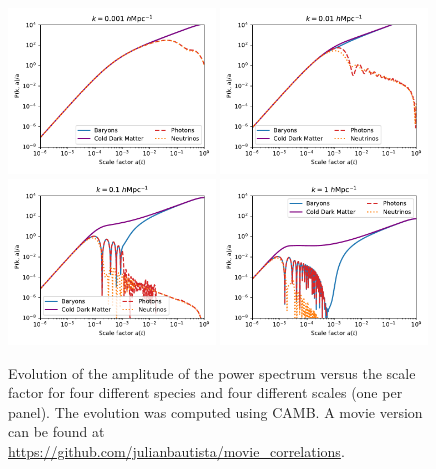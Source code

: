     \begin{figure}[t]
        \centering
        \includegraphics[width=0.49\textwidth]{fig/intro/pk_versus_time_k0.001.pdf}
        \includegraphics[width=0.49\textwidth]{fig/intro/pk_versus_time_k0.01.pdf}
        \includegraphics[width=0.49\textwidth]{fig/intro/pk_versus_time_k0.1.pdf}
        \includegraphics[width=0.49\textwidth]{fig/intro/pk_versus_time_k1.pdf}
        \caption{Evolution of the amplitude of the power spectrum versus the scale factor 
        for four different species and four different scales (one per panel). 
        The evolution was computed using \textsc{CAMB}. A movie version can be found 
        at \url{https://github.com/julianbautista/movie_correlations}.}
        \label{fig:pk_evolution}
    \end{figure}

